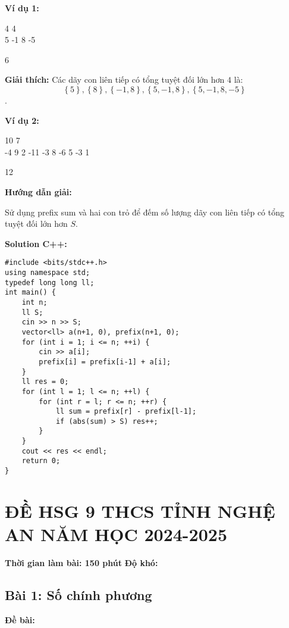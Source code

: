 \documentclass[12pt]{scrartcl}  %
\begin{document}
\textbf{Ví dụ 1:}
\begin{tcolorbox}[colback=gray!5!white, colframe=blue!50!black, title=Input]
4 4\\
5 -1 8 -5
\end{tcolorbox}
\begin{tcolorbox}[colback=gray!5!white, colframe=green!50!black, title=Output]
6
\end{tcolorbox}

\textbf{Giải thích:}
Các dãy con liên tiếp có tổng tuyệt đối lớn hơn $4$ là: $$\left\{5 \right\}, \left\{ 8 \right\}, \left\{ -1, 8 \right\}, \left\{ 5, -1, 8 \right\}, \left\{ 5, -1, 8, -5 \right\}$$.

\textbf{Ví dụ 2:}
\begin{tcolorbox}[colback=gray!5!white, colframe=blue!50!black, title=Input]
10 7\\
-4 9 2 -11 -3 8 -6 5 -3 1
\end{tcolorbox}
\begin{tcolorbox}[colback=gray!5!white, colframe=green!50!black, title=Output]
12
\end{tcolorbox}

\textbf{Hướng dẫn giải:}

Sử dụng prefix sum và hai con trỏ để đếm số lượng dãy con liên tiếp có tổng tuyệt đối lớn hơn $S$.

\textbf{Solution C++:}
\begin{lstlisting}
#include <bits/stdc++.h>
using namespace std;
typedef long long ll;
int main() {
    int n;
    ll S;
    cin >> n >> S;
    vector<ll> a(n+1, 0), prefix(n+1, 0);
    for (int i = 1; i <= n; ++i) {
        cin >> a[i];
        prefix[i] = prefix[i-1] + a[i];
    }
    ll res = 0;
    for (int l = 1; l <= n; ++l) {
        for (int r = l; r <= n; ++r) {
            ll sum = prefix[r] - prefix[l-1];
            if (abs(sum) > S) res++;
        }
    }
    cout << res << endl;
    return 0;
}
\end{lstlisting}

\section{ĐỀ HSG 9 THCS TỈNH NGHỆ AN NĂM HỌC 2024-2025}
\textbf{Thời gian làm bài: 150 phút}
\textbf{Độ khó: }
\subsection{Bài 1: Số chính phương}

\textbf{Đề bài:}
\end{document}
